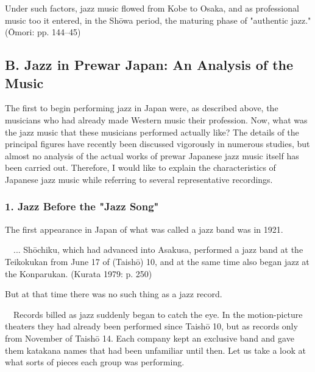 Under such factors, jazz music flowed from Kobe to Osaka, and as professional music too it entered, in the Shōwa period, the maturing phase of "authentic jazz." (Ōmori: pp. 144–45)

\subsection{B. Jazz in Prewar Japan: An Analysis of the Music}

The first to begin performing jazz in Japan were, as described above, the musicians who had already made Western music their profession. Now, what was the jazz music that these musicians performed actually like? The details of the principal figures have recently been discussed vigorously in numerous studies, but almost no analysis of the actual works of prewar Japanese jazz music itself has been carried out. Therefore, I would like to explain the characteristics of Japanese jazz music while referring to several representative recordings.

\subsubsection{1. Jazz Before the "Jazz Song"}

The first appearance in Japan of what was called a jazz band was in 1921.

\begin{gquote}
　... Shōchiku, which had advanced into Asakusa, performed a jazz band at the Teikokukan from June 17 of (Taishō) 10, and at the same time also began jazz at the Konparukan. (Kurata 1979: p. 250)
\end{gquote}

But at that time there was no such thing as a jazz record.

\begin{gquote}
　Records billed as jazz suddenly began to catch the eye. In the motion-picture theaters they had already been performed since Taishō 10, but as records only from November of Taishō 14. Each company kept an exclusive band and gave them katakana names that had been unfamiliar until then. Let us take a look at what sorts of pieces each group was performing.
\end{gquote}

